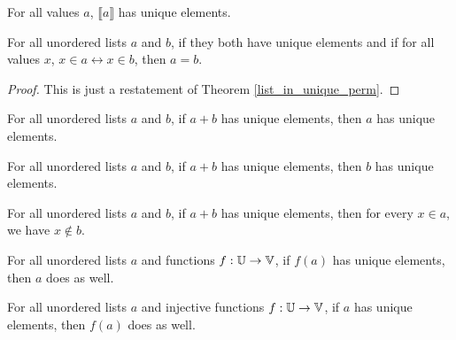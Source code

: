 \documentclass[../../math.tex]{subfiles}
\begin{document}
\begin{theorem}
    For all values $a$, $\llbracket a\rrbracket$ has unique elements.
\end{theorem}

\begin{theorem} \label{ulist_in_unique_eq}
    For all unordered lists $a$ and $b$, if they both have unique elements and
    if for all values $x$, $x \in a \leftrightarrow x \in b$, then $a = b$.
\end{theorem}
\begin{proof}
    This is just a restatement of Theorem \ref{list_in_unique_perm}.
\end{proof}

\begin{theorem} \label{ulist_unique_lconc}
    For all unordered lists $a$ and $b$, if $a + b$ has unique elements, then
    $a$ has unique elements.
\end{theorem}

\begin{theorem} \label{ulist_unique_rconc}
    For all unordered lists $a$ and $b$, if $a + b$ has unique elements, then
    $b$ has unique elements.
\end{theorem}

\begin{theorem} \label{ulist_unique_conc}
    For all unordered lists $a$ and $b$, if $a + b$ has unique elements, then
    for every $x \in a$, we have $x \notin b$.
\end{theorem}

\begin{theorem} \label{ulist_image_unique}
    For all unordered lists $a$ and functions $f : \mathbb{U} \to \mathbb{V}$, if $f(a)$ has
    unique elements, then $a$ does as well.
\end{theorem}

\begin{theorem} \label{ulist_image_unique_inj}
    For all unordered lists $a$ and injective functions $f : \mathbb{U} \to \mathbb{V}$, if $a$
    has unique elements, then $f(a)$ does as well.
\end{theorem}
\end{document}
